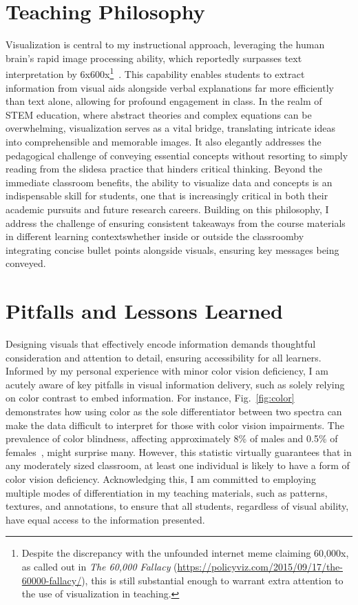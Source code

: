 \section{Teaching Philosophy}
Visualization is central to my instructional approach, leveraging the human brain's rapid image processing ability, which reportedly surpasses text interpretation by 6x\textendash 600x\footnote{
    Despite the discrepancy with the unfounded internet meme claiming 60,000x, as called out in \emph{The 60,000 Fallacy} (\url{https://policyviz.com/2015/09/17/the-60000-fallacy/}), this is still substantial enough to warrant extra attention to the use of visualization in teaching.
}~\cite{ResearchPictureWorth}.
This capability enables students to extract information from visual aids alongside verbal explanations far more efficiently than text alone, allowing for profound engagement in class. In the realm of STEM education, where abstract theories and complex equations can be overwhelming, visualization serves as a vital bridge, translating intricate ideas into comprehensible and memorable images. It also elegantly addresses the pedagogical challenge of conveying essential concepts without resorting to simply reading from the slides\textemdash a practice that hinders critical thinking. Beyond the immediate classroom benefits, the ability to visualize data and concepts is an indispensable skill for students, one that is increasingly critical in both their academic pursuits and future research careers. Building on this philosophy, I address the challenge of ensuring consistent takeaways from the course materials in different learning contexts\textemdash whether inside or outside the classroom\textemdash by integrating concise bullet points alongside visuals, ensuring key messages being conveyed.

\section{Pitfalls and Lessons Learned}
Designing visuals that effectively encode information demands thoughtful consideration and attention to detail, ensuring accessibility for all learners. Informed by my personal experience with minor color vision deficiency, I am acutely aware of key pitfalls in visual information delivery, such as solely relying on color contrast to embed information. For instance, Fig.~\ref{fig:color} demonstrates how using color as the sole differentiator between two spectra can make the data difficult to interpret for those with color vision impairments. The prevalence of color blindness, affecting approximately 8\% of males and 0.5\% of females~\cite{TypesColourBlindness}, might surprise many. However, this statistic virtually guarantees that in any moderately sized classroom, at least one individual is likely to have a form of color vision deficiency. Acknowledging this, I am committed to employing multiple modes of differentiation in my teaching materials, such as patterns, textures, and annotations, to ensure that all students, regardless of visual ability, have equal access to the information presented.

